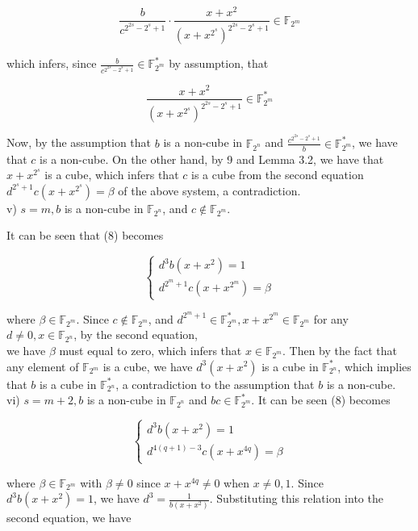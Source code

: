 \documentclass[10pt]{article}
\begin{document}
$$
\frac{b}{c^{2^{2 s}-2^{s}+1}} \cdot \frac{x+x^{2}}{\left(x+x^{2^{s}}\right)^{2^{2 s}-2^{s}+1}} \in \mathbb{F}_{2^{m}}
$$

which infers, since $\frac{b}{c^{2^{2 s}-2^{s}+1}} \in \mathbb{F}_{2^{m}}^{*}$ by assumption, that


\begin{equation*}
\frac{x+x^{2}}{\left(x+x^{2^{s}}\right)^{2^{2 s}-2^{s}+1}} \in \mathbb{F}_{2^{m}}^{*} \tag{9}
\end{equation*}


Now, by the assumption that $b$ is a non-cube in $\mathbb{F}_{2^{n}}$ and $\frac{c^{2^{2 s}-2^{s}+1}}{b} \in \mathbb{F}_{2^{m}}^{*}$, we have that $c$ is a non-cube. On the other hand, by 9 and Lemma 3.2, we have that $x+x^{2^{s}}$ is a cube, which infers that $c$ is a cube from the second equation $d^{2^{s}+1} c\left(x+x^{2^{s}}\right)=\beta$ of the above system, a contradiction.\\
v) $s=m, b$ is a non-cube in $\mathbb{F}_{2^{n}}$, and $c \notin \mathbb{F}_{2^{m}}$.

It can be seen that (8) becomes

$$
\left\{\begin{array}{l}
d^{3} b\left(x+x^{2}\right)=1 \\
d^{2^{m}+1} c\left(x+x^{2^{m}}\right)=\beta
\end{array}\right.
$$

where $\beta \in \mathbb{F}_{2^{m}}$. Since $c \notin \mathbb{F}_{2^{m}}$, and $d^{2^{m}+1} \in \mathbb{F}_{2^{m}}^{*}, x+x^{2^{m}} \in \mathbb{F}_{2^{m}}$ for any $d \neq 0, x \in \mathbb{F}_{2^{n}}$, by the second equation,\\
we have $\beta$ must equal to zero, which infers that $x \in \mathbb{F}_{2^{m}}$. Then by the fact that any element of $\mathbb{F}_{2^{m}}$ is a cube, we have $d^{3}\left(x+x^{2}\right)$ is a cube in $\mathbb{F}_{2^{n}}^{*}$, which implies that $b$ is a cube in $\mathbb{F}_{2^{n}}^{*}$, a contradiction to the assumption that $b$ is a non-cube.\\
vi) $s=m+2, b$ is a non-cube in $\mathbb{F}_{2^{n}}$ and $b c \in \mathbb{F}_{2^{m}}^{*}$. It can be seen (8) becomes

$$
\left\{\begin{array}{l}
d^{3} b\left(x+x^{2}\right)=1 \\
d^{4(q+1)-3} c\left(x+x^{4 q}\right)=\beta
\end{array}\right.
$$

where $\beta \in \mathbb{F}_{2^{m}}$ with $\beta \neq 0$ since $x+x^{4 q} \neq 0$ when $x \neq 0,1$. Since $d^{3} b\left(x+x^{2}\right)=1$, we have $d^{3}=\frac{1}{b\left(x+x^{2}\right)}$. Substituting this relation into the second equation, we have
\end{document}
